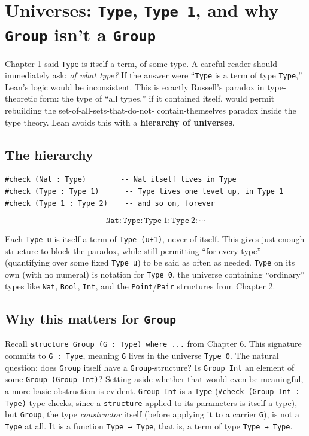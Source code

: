 \section{\texorpdfstring{Universes: \texttt{Type}, \texttt{Type\ 1}, and why \texttt{Group} isn't a \texttt{Group}}{Universes: Type, Type 1, and why Group isn't a Group}}\label{sec:05-rigor-check:02-universes:1}

Chapter 1 said \texttt{Type} is itself a term, of some type. A careful reader should immediately ask: \emph{of what type?} If the answer were ``\texttt{Type} is a term of type \texttt{Type},'' Lean's logic would be inconsistent. This is exactly Russell's paradox in type-theoretic form: the type of ``all types,'' if it contained itself, would permit rebuilding the set-of-all-sets-that-do-not- contain-themselves paradox inside the type theory. Lean avoids this with a \textbf{hierarchy of universes}.

\subsection{The hierarchy}\label{sec:05-rigor-check:02-universes:2}

\begin{lstlisting}
#check (Nat : Type)        -- Nat itself lives in Type
#check (Type : Type 1)      -- Type lives one level up, in Type 1
#check (Type 1 : Type 2)    -- and so on, forever
\end{lstlisting}

\[
\mathtt{Nat} : \mathtt{Type} : \mathtt{Type}\ 1 : \mathtt{Type}\ 2 : \cdots
\]

Each \texttt{Type u} is itself a term of \texttt{Type (u+1)}, never of itself. This gives just enough structure to block the paradox, while still permitting ``for every type'' (quantifying over some fixed \texttt{Type u}) to be said as often as needed. \texttt{Type} on its own (with no numeral) is notation for \texttt{Type 0}, the universe containing ``ordinary'' types like \texttt{Nat}, \texttt{Bool}, \texttt{Int}, and the \texttt{Point}/\texttt{Pair} structures from Chapter 2.

\subsection{\texorpdfstring{Why this matters for \texttt{Group}}{Why this matters for Group}}\label{sec:05-rigor-check:02-universes:3}

Recall \texttt{structure Group (G : Type) where ...} from Chapter 6. This signature commits to \texttt{G : Type}, meaning \texttt{G} lives in the universe \texttt{Type 0}. The natural question: does \texttt{Group} itself have a \texttt{Group}-structure? Is \texttt{Group Int} an element of some \texttt{Group (Group Int)}? Setting aside whether that would even be meaningful, a more basic obstruction is evident. \texttt{Group Int} is a \texttt{Type} (\texttt{\#check (Group Int : Type)} type-checks, since a \texttt{structure} applied to its parameters is itself a type), but \texttt{Group}, the type \emph{constructor} itself (before applying it to a carrier \texttt{G}), is not a \texttt{Type} at all. It is a function \texttt{Type → Type}, that is, a term of type \texttt{Type → Type}.

